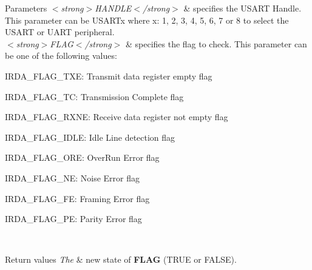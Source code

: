 \begin{DoxyParams}{Parameters}
{\em $<$strong$>$\+H\+A\+N\+D\+L\+E$<$/strong$>$} & specifies the U\+S\+A\+RT Handle. This parameter can be U\+S\+A\+R\+Tx where x\+: 1, 2, 3, 4, 5, 6, 7 or 8 to select the U\+S\+A\+RT or U\+A\+RT peripheral. \\
\hline
{\em $<$strong$>$\+F\+L\+A\+G$<$/strong$>$} & specifies the flag to check. This parameter can be one of the following values\+: \begin{DoxyItemize}
\item I\+R\+D\+A\+\_\+\+F\+L\+A\+G\+\_\+\+T\+XE\+: Transmit data register empty flag \item I\+R\+D\+A\+\_\+\+F\+L\+A\+G\+\_\+\+TC\+: Transmission Complete flag \item I\+R\+D\+A\+\_\+\+F\+L\+A\+G\+\_\+\+R\+X\+NE\+: Receive data register not empty flag \item I\+R\+D\+A\+\_\+\+F\+L\+A\+G\+\_\+\+I\+D\+LE\+: Idle Line detection flag \item I\+R\+D\+A\+\_\+\+F\+L\+A\+G\+\_\+\+O\+RE\+: Over\+Run Error flag \item I\+R\+D\+A\+\_\+\+F\+L\+A\+G\+\_\+\+NE\+: Noise Error flag \item I\+R\+D\+A\+\_\+\+F\+L\+A\+G\+\_\+\+FE\+: Framing Error flag \item I\+R\+D\+A\+\_\+\+F\+L\+A\+G\+\_\+\+PE\+: Parity Error flag \end{DoxyItemize}
\\
\hline
\end{DoxyParams}

\begin{DoxyRetVals}{Return values}
{\em The} & new state of {\bfseries F\+L\+AG} (T\+R\+UE or F\+A\+L\+SE). \\
\hline
\end{DoxyRetVals}
